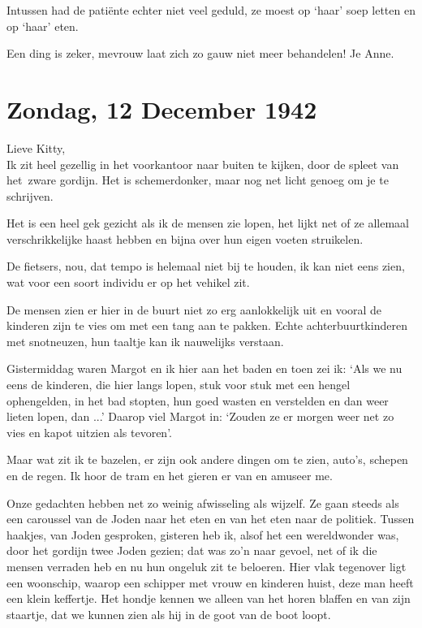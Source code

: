 \documentclass{book}
\begin{document}
Intussen had de patiënte echter niet veel geduld, ze moest op `haar' soep letten
en op `haar' eten.

Een ding is zeker, mevrouw laat zich zo gauw niet meer behandelen! Je Anne.

\section*{Zondag, 12 December 1942}

Lieve Kitty,\\
Ik zit heel gezellig in het voorkantoor naar buiten te kijken,
door de spleet van het~zware gordijn. Het is schemerdonker, maar nog net licht
genoeg om je te schrijven.

Het is een heel gek gezicht als ik de mensen zie lopen, het lijkt net of ze
allemaal verschrikkelijke haast hebben en bijna over hun eigen voeten
struikelen.

De fietsers, nou, dat tempo is helemaal niet bij te houden, ik kan niet eens
zien, wat voor een soort individu er op het vehikel zit.

De mensen zien er hier in de buurt niet zo erg aanlokkelijk uit en vooral de
kinderen zijn te vies om met een tang aan te pakken. Echte achterbuurtkinderen
met snotneuzen, hun taaltje kan ik nauwelijks verstaan.

Gistermiddag waren Margot en ik hier aan het baden en toen zei ik: `Als we nu
eens de kinderen, die hier langs lopen, stuk voor stuk met een hengel
ophengelden, in het bad stopten, hun goed wasten en verstelden en dan weer
lieten lopen, dan ...' Daarop viel Margot in: `Zouden ze er morgen weer net zo
vies en kapot uitzien als tevoren'.

Maar wat zit ik te bazelen, er zijn ook andere dingen om te zien, auto's,
schepen en de regen. Ik hoor de tram en het gieren er van en amuseer me.

Onze gedachten hebben net zo weinig afwisseling als wijzelf. Ze gaan steeds als
een caroussel van de Joden naar het eten en van het eten naar de politiek.
Tussen haakjes, van Joden gesproken, gisteren heb ik, alsof het een wereldwonder
was, door het gordijn twee Joden gezien; dat was zo'n naar gevoel, net of ik die
mensen verraden heb en nu hun ongeluk zit te beloeren. Hier vlak tegenover ligt
een woonschip, waarop een schipper met vrouw en kinderen huist, deze man heeft
een klein keffertje. Het hondje kennen we alleen van het horen blaffen en van
zijn staartje, dat we kunnen zien als hij in de goot van de boot loopt.
\end{document}
